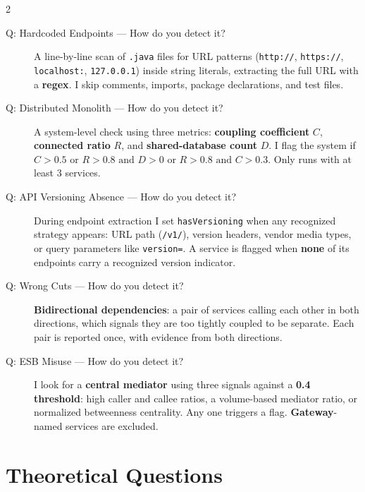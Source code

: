 \documentclass[10pt,a4paper]{article}
\begin{document}
\begin{multicols}{2}
\begin{description}
    \item[Q: Hardcoded Endpoints --- How do you detect it?]
    A line-by-line scan of \texttt{.java} files for URL patterns (\texttt{http://}, \texttt{https://}, \texttt{localhost:}, \texttt{127.0.0.1}) inside string literals, extracting the full URL with a \textbf{regex}. I skip comments, imports, package declarations, and test files.

    \item[Q: Distributed Monolith --- How do you detect it?]
    A system-level check using three metrics: \textbf{coupling coefficient} \(C\), \textbf{connected ratio} \(R\), and \textbf{shared-database count} \(D\). I flag the system if $C > 0.5$ or $R > 0.8 \text{ and } D > 0$ or $R > 0.8 \text{ and } C > 0.3$. Only runs with at least 3 services.

    \item[Q: API Versioning Absence --- How do you detect it?]
    During endpoint extraction I set \texttt{hasVersioning} when any recognized strategy appears: URL path (\texttt{/v1/}), version headers, vendor media types, or query parameters like \texttt{version=}. A service is flagged when \textbf{none} of its endpoints carry a recognized version indicator.

    \item[Q: Wrong Cuts --- How do you detect it?]
    \textbf{Bidirectional dependencies}: a pair of services calling each other in both directions, which signals they are too tightly coupled to be separate. Each pair is reported once, with evidence from both directions.

    \item[Q: ESB Misuse --- How do you detect it?]
    I look for a \textbf{central mediator} using three signals against a \textbf{0.4 threshold}: high caller and callee ratios, a volume-based mediator ratio, or normalized betweenness centrality. Any one triggers a flag. \textbf{Gateway}-named services are excluded.
\end{description}

\section{Theoretical Questions}

\begin{description}


\end{description}
\end{multicols}
\end{document}
